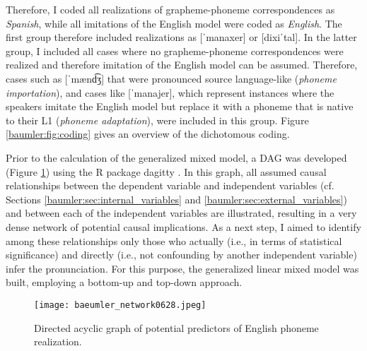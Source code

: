 \documentclass[output=paper]{langscibook}
\begin{document}
Therefore, I coded all realizations of grapheme-phoneme correspondences as \textit{Spanish}, while all imitations of the English model were coded as \textit{English}. The first group therefore included realizations as [ˈmanaxer] or [dixiˈtal]. In the latter group, I included all cases where no grapheme-phoneme correspondences were realized and therefore imitation of the English model can be assumed. Therefore, cases such as [ˈm\ae n\textsci d͡ʒ\textrhookschwa] that were pronounced source language-like (\textit{phoneme importation}), and cases like [ˈmanajer], which represent instances where the speakers imitate the English model but replace it with a phoneme that is native to their L1 (\textit{phoneme adaptation}), were included in this group. Figure \ref{baumler:fig:coding} gives an overview of the dichotomous coding.

Prior to the calculation of the generalized mixed model, a \gls*{DAG} was developed (Figure \ref{baumler:fig:dag}) using the R package dagitty \citep[]{dag}. 
In this graph, all assumed causal relationships between the dependent variable and independent variables (cf. Sections \ref{baumler:sec:internal_variables} and \ref{baumler:sec:external_variables}) and between each of the independent variables are illustrated, resulting in a very dense network of potential causal implications.
As a next step, I aimed to identify among these relationships only those who actually (i.e., in terms of statistical significance) and directly (i.e., not confounding by another independent variable) infer the pronunciation. For this purpose, the generalized linear mixed model was built, employing a bottom-up and top-down approach.

\begin{figure}
\texttt{[image: baeumler\_network0628.jpeg]}
\caption{Directed acyclic graph of potential predictors of English phoneme realization.}
\label{baumler:fig:dag}
\end{figure}
\end{document}
